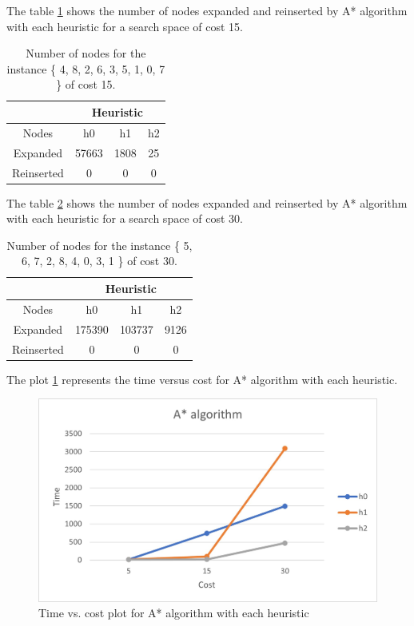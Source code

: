 \documentclass[runningheads]{llncs}
\begin{document}
The table \ref{tab:table2} shows the number of nodes expanded and reinserted by A* algorithm with each heuristic for a search space of cost 15.
\begin{table}
    \centering
\caption{\label{tab:table2}Number of nodes for the instance \{ 4, 8, 2, 6, 3, 5, 1, 0, 7 \} of cost 15.}
    \begin{tabular}{|c|c|c|c|}
    \hline
       & \multicolumn{3}{|c|}{Heuristic} \\ \hline
        Nodes & h0 & h1 & h2 \\ \hline
        Expanded & 57663 & 1808 & 25 \\ \hline
        Reinserted & 0 & 0 & 0 \\ \hline
    \end{tabular}
\end{table}

The table \ref{tab:table3} shows the number of nodes expanded and reinserted by A* algorithm with each heuristic for a search space of cost 30.
\begin{table}
    \centering
\caption{\label{tab:table3}Number of nodes for the instance \{ 5, 6, 7, 2, 8, 4, 0, 3, 1 \} of cost 30.}
    \begin{tabular}{|c|c|c|c|}
    \hline
       & \multicolumn{3}{|c|}{Heuristic} \\ \hline
        Nodes & h0 & h1 & h2 \\ \hline
        Expanded & 175390 & 103737 & 9126 \\ \hline
        Reinserted & 0 & 0 & 0 \\ \hline
    \end{tabular}
\end{table}

The plot \ref{fig:astar} represents the time versus cost for A* algorithm with each heuristic.
\begin{figure}[H]
    \centering
    \includegraphics{AStarTimes.jpg}
    \caption{Time vs. cost plot for A* algorithm with each heuristic}
    \label{fig:astar}
\end{figure}
\end{document}
